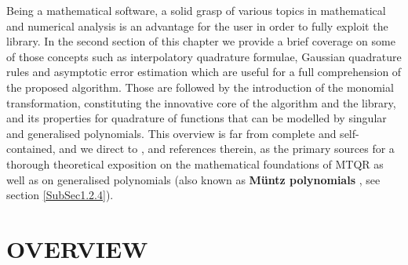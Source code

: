 \documentclass[a4paper, twosided]{book}
\begin{document}
Being a mathematical software, a solid grasp of various topics in mathematical and numerical analysis is an advantage for the user in order to fully exploit the library. In the second section of this chapter we provide a brief coverage on some of those concepts such as interpolatory quadrature formulae, Gaussian quadrature rules and asymptotic error estimation which are useful for a full comprehension of the proposed algorithm. Those are followed by the introduction of the monomial transformation, constituting the innovative core of the algorithm and the library, and its properties for quadrature of functions that can be modelled by singular and generalised polynomials. This overview is far from complete and self-contained, and we direct to \cite{Lombardi09, Lombardi21}, and references therein, as the primary sources for a thorough theoretical exposition on the mathematical foundations of MTQR as well as on generalised polynomials (also known as \color{poliDarkBlue} \textbf{Müntz polynomials} \color{black}, see section \ref{SubSec1.2.4}).

\section[Overview]{\changefont OVERVIEW}\label{Sec1.1}
\end{document}

